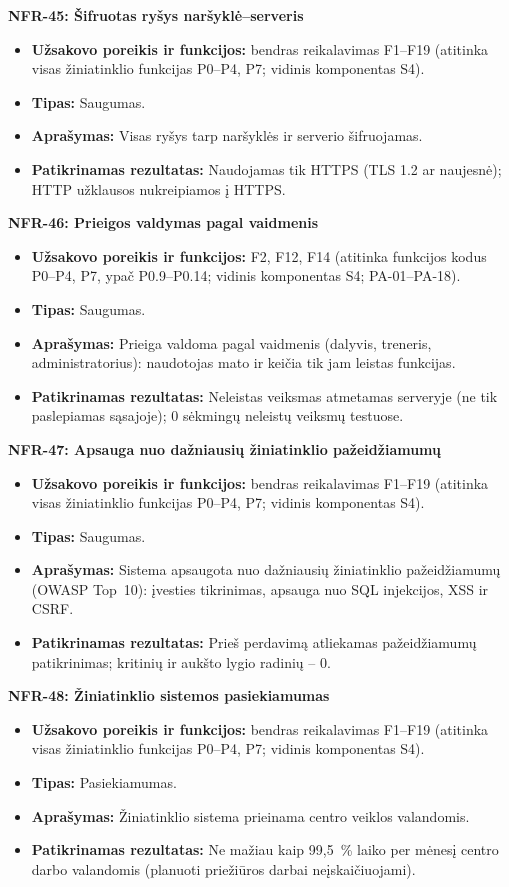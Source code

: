 \noindent\textbf{NFR-45: Šifruotas ryšys naršyklė--serveris}
\begin{itemize}
    \item \textbf{Užsakovo poreikis ir funkcijos:} bendras reikalavimas F1--F19 (atitinka visas žiniatinklio funkcijas P0--P4, P7; vidinis komponentas S4).
    \item \textbf{Tipas:} Saugumas.
    \item \textbf{Aprašymas:} Visas ryšys tarp naršyklės ir serverio šifruojamas.
    \item \textbf{Patikrinamas rezultatas:} Naudojamas tik HTTPS (TLS 1.2 ar naujesnė); HTTP užklausos nukreipiamos į HTTPS.
\end{itemize}

\noindent\textbf{NFR-46: Prieigos valdymas pagal vaidmenis}
\begin{itemize}
    \item \textbf{Užsakovo poreikis ir funkcijos:} F2, F12, F14 (atitinka funkcijos kodus P0--P4, P7, ypač P0.9--P0.14; vidinis komponentas S4; PA-01--PA-18).
    \item \textbf{Tipas:} Saugumas.
    \item \textbf{Aprašymas:} Prieiga valdoma pagal vaidmenis (dalyvis, treneris, administratorius): naudotojas mato ir keičia tik jam leistas funkcijas.
    \item \textbf{Patikrinamas rezultatas:} Neleistas veiksmas atmetamas serveryje (ne tik paslepiamas sąsajoje); 0 sėkmingų neleistų veiksmų testuose.
\end{itemize}

\noindent\textbf{NFR-47: Apsauga nuo dažniausių žiniatinklio pažeidžiamumų}
\begin{itemize}
    \item \textbf{Užsakovo poreikis ir funkcijos:} bendras reikalavimas F1--F19 (atitinka visas žiniatinklio funkcijas P0--P4, P7; vidinis komponentas S4).
    \item \textbf{Tipas:} Saugumas.
    \item \textbf{Aprašymas:} Sistema apsaugota nuo dažniausių žiniatinklio pažeidžiamumų (OWASP Top~10): įvesties tikrinimas, apsauga nuo SQL injekcijos, XSS ir CSRF.
    \item \textbf{Patikrinamas rezultatas:} Prieš perdavimą atliekamas pažeidžiamumų patikrinimas; kritinių ir aukšto lygio radinių -- 0.
\end{itemize}

\noindent\textbf{NFR-48: Žiniatinklio sistemos pasiekiamumas}
\begin{itemize}
    \item \textbf{Užsakovo poreikis ir funkcijos:} bendras reikalavimas F1--F19 (atitinka visas žiniatinklio funkcijas P0--P4, P7; vidinis komponentas S4).
    \item \textbf{Tipas:} Pasiekiamumas.
    \item \textbf{Aprašymas:} Žiniatinklio sistema prieinama centro veiklos valandomis.
    \item \textbf{Patikrinamas rezultatas:} Ne mažiau kaip 99,5~\% laiko per mėnesį centro darbo valandomis (planuoti priežiūros darbai neįskaičiuojami).
\end{itemize}

